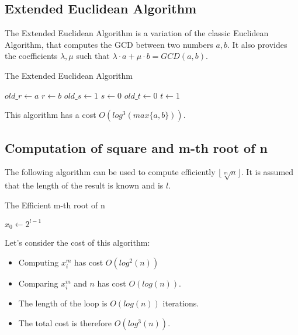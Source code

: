 \documentclass[12pt, a4paper, english]{report}
\begin{document}
\subsection{Extended Euclidean Algorithm}
The Extended Euclidean Algorithm is a variation of the classic Euclidean Algorithm, that computes the GCD between two numbers $a, b$. \newline
It also provides the coefficients $\lambda, \mu$ such that $\lambda \cdot a + \mu \cdot b = GCD(a,b)$.\newline
{}
\begin{algorithm}
\caption{The Extended Euclidean Algorithm}\label{alg:ExtEucAlg}
$old\_r \gets a$\;
$r \gets b$\;
$old\_s \gets 1$\;
$s \gets 0$\;
$old\_t \gets 0$\;
$t \gets 1$\;
\end{algorithm}
This algorithm has a cost $O(log^{3}(max\{a, b \}))$.

\subsection{Computation of square and m-th root of n}
The following algorithm can be used to compute efficiently $\lfloor \sqrt[m]{n} \rfloor$.\newline
It is assumed that the length of the result is known and is $l$.\newline
{}
\begin{algorithm}
\caption{The Efficient m-th root of n}\label{alg:m_root}
$x_{0} \gets 2^{l - 1}$\;
\end{algorithm}
Let's consider the cost of this algorithm:
\begin{itemize}
    \item Computing $x_{i}^{m}$ has cost $O(log^{2}(n))$
    \item Comparing $x_{i}^{m}$ and $n$ has cost $O(log(n))$.
    \item The length of the loop is $O(log(n))$ iterations.
    \item The total cost is therefore $O(log^{3}(n))$.
\end{itemize}
\end{document}
